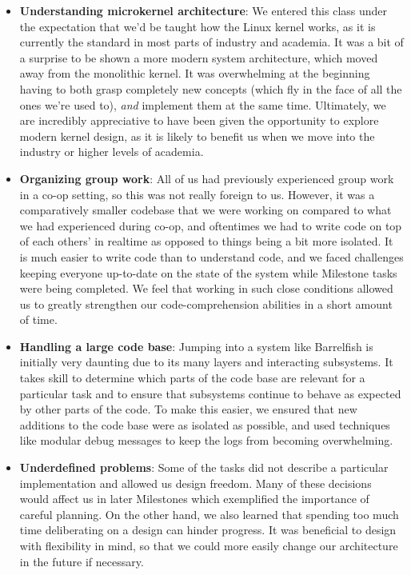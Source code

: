 \begin{itemize}
    \item \textbf{Understanding microkernel architecture}:
    We entered this class under the expectation that we'd be taught how the Linux kernel works, as it is currently the standard in most parts of industry and academia. It was a bit of a surprise to be shown a more modern system architecture, which moved away from the monolithic kernel. It was overwhelming at the beginning having to both grasp completely new concepts (which fly in the face of all the ones we're used to), \textit{and} implement them at the same time. Ultimately, we are incredibly appreciative to have been given the opportunity to explore modern kernel design, as it is likely to benefit us when we move into the industry or higher levels of academia. 
    \item \textbf{Organizing group work}:
    All of us had previously experienced group work in a co-op setting, so this was not really foreign to us. However, it was a comparatively smaller codebase that we were working on compared to what we had experienced during co-op, and oftentimes we had to write code on top of each others' in realtime as opposed to things being a bit more isolated. It is much easier to write code than to understand code, and we faced challenges keeping everyone up-to-date on the state of the system while Milestone tasks were being completed. We feel that working in such close conditions allowed us to greatly strengthen our code-comprehension abilities in a short amount of time.
    \item \textbf{Handling a large code base}: Jumping into a system like Barrelfish is initially very daunting due to its many layers and interacting subsystems. It takes skill to determine which parts of the code base are relevant for a particular task and to ensure that subsystems continue to behave as expected by other parts of the code. To make this easier, we ensured that new additions to the code base were as isolated as possible, and used techniques like modular debug messages to keep the logs from becoming overwhelming.
    \item \textbf{Underdefined problems}: Some of the tasks did not describe a particular implementation and allowed us design freedom. Many of these decisions would affect us in later Milestones which exemplified the importance of careful planning. On the other hand, we also learned that spending too much time deliberating on a design can hinder progress. It was beneficial to design with flexibility in mind, so that we could more easily change our architecture in the future if necessary.
\end{itemize}
